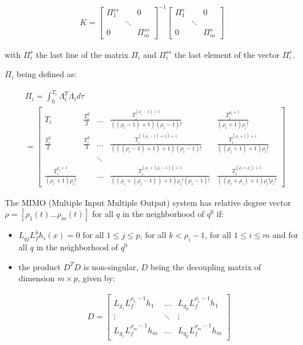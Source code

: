 \documentclass[letterpaper, 10 pt, conference]{ieeeconf}  %
\begin{document}
\begin{eqnarray}
K = 
\left[
\begin{array}{ccc}
\Pi^{ss}_1 & & 0\\
& \ddots &\\
0 & & \Pi^{ss}_m
\end{array}\right]^{-1}
\left[\begin{array}{ccc}
\Pi^{s}_1 & & 0\\
& \ddots &\\
0 & & \Pi^{s}_m
\end{array}\right]
\end{eqnarray}

with $\Pi^{s}_i$ the last line of the matrix $\Pi_i$ and $\Pi^{ss}_i$ the last element of the vector $\Pi^{s}_i$. 

$\Pi_i$ being defined as:


\begin{align}
&\Pi_i = \int^{T_i}_0\Lambda_i^T\Lambda_id\tau\\
&=  \left[\begin{array}{cccccc}
T_i & \frac{T_i^2}{2} & \dots & \frac{T_i^{(\rho_i-1)+1}}{((\rho_i-1)+1)(\rho_i-1)!} & \frac{T_i^{\rho_i+1}}{(\rho_i+1)\rho_i!}\\
\frac{T_i^2}{2} & \frac{T_i^3}{3} & \dots &  \frac{T_i^{((\rho_i-1)+1)+1}}{(((\rho_i-1)+1)+1)(\rho_i-1)!} & \frac{T_i^{(\rho_i+1)+1}}{((\rho_i+1)+1)\rho_i!}\\
& & \ddots & & \\
\frac{T_i^{\rho_i+1}}{(\rho_i+1)\rho_i!} & & \dots & \frac{T_i^{(\rho_i+(\rho_i-1))+1}}{((\rho_i+(\rho_i-1))+1)\rho_i!(\rho_i-1)!} & \frac{T_i^{(\rho_i+\rho_i)+1}}{((\rho_i+\rho_i)+1)\rho_i!\rho_i!}
\end{array}\right]
\end{align}

The MIMO (Multiple Input Multiple Output) system has relative degree vector $\rho = [\rho_1(t) \dots \rho_m(t)]$ for all $q$ in the neighborhood of $q^0$ if:

\begin{itemize}
\item $L_{gj}L_f^kh_i(x) = 0$ for all $1 \leq j \leq p$, for all $k < \rho_i-1$, for all $1 \leq i \leq m$ and for all $q$ in the neighborhood of $q^0$
\item the product $D^TD$ is non-singular, $D$ being the decoupling matrix of dimension $m \times p$, given by:

\begin{eqnarray}
D = 
\left[\begin{array}{ccc}
L_{g_1}L_f^{\rho_1-1}h_1 & \dots & L_{g_p}L_f^{\rho_1-1}h_1\\
\vdots & \ddots & \vdots\\
L_{g_1}L_f^{\rho_m-1}h_m & \dots & L_{g_p}L_f^{\rho_m-1}h_m
\end{array}\right]
\end{eqnarray}
\end{itemize}
\end{document}
